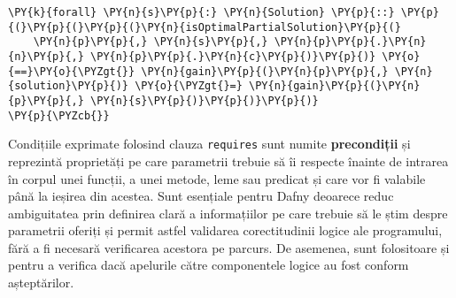 \begin{sloppypar}
\begin{Verbatim}[commandchars=\\\{\}]
  \PY{k}{forall} \PY{n}{s}\PY{p}{:} \PY{n}{Solution} \PY{p}{::} \PY{p}{(}\PY{p}{(}\PY{p}{(}\PY{n}{isOptimalPartialSolution}\PY{p}{(}
    \PY{n}{p}\PY{p}{,} \PY{n}{s}\PY{p}{,} \PY{n}{p}\PY{p}{.}\PY{n}{n}\PY{p}{,} \PY{n}{p}\PY{p}{.}\PY{n}{c}\PY{p}{)}\PY{p}{)} \PY{o}{==}\PY{o}{\PYZgt{}} \PY{n}{gain}\PY{p}{(}\PY{n}{p}\PY{p}{,} \PY{n}{solution}\PY{p}{)} \PY{o}{\PYZgt{}=} \PY{n}{gain}\PY{p}{(}\PY{n}{p}\PY{p}{,} \PY{n}{s}\PY{p}{)}\PY{p}{)}\PY{p}{)}
\PY{p}{\PYZcb{}}
\end{Verbatim}
\par Condițiile exprimate folosind clauza \texttt{requires} sunt numite \textbf{precondiții} și reprezintă proprietăți pe care parametrii trebuie să îi respecte înainte de intrarea în corpul unei funcții, a unei metode, leme sau predicat și care vor fi valabile până la ieșirea din acestea. Sunt esențiale pentru Dafny deoarece reduc ambiguitatea prin definirea clară a informațiilor pe care trebuie să le știm despre parametrii oferiți și permit astfel validarea corectitudinii logice ale programului, fără a fi necesară verificarea acestora pe parcurs. De asemenea, sunt folositoare și pentru a verifica dacă apelurile către componentele logice au fost conform așteptărilor.


\end{sloppypar}
